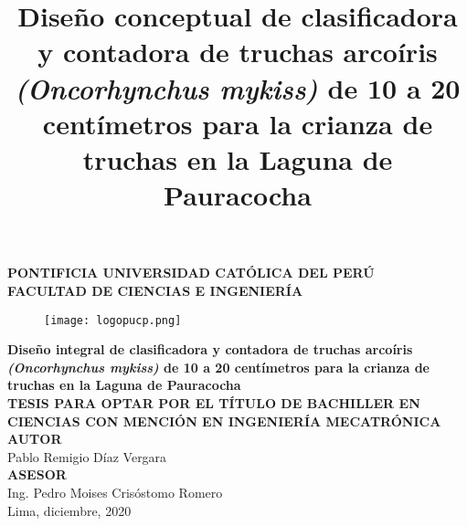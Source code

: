 \clearpage{\pagestyle{empty}\cleardoublepage}
\begin{titlepage}
	\begin{center}
		{\Large \bf PONTIFICIA UNIVERSIDAD CATÓLICA DEL PERÚ}\\
		\vspace{0.8 cm} 
		{\Large \bf FACULTAD DE CIENCIAS E INGENIERÍA}\\
		\vspace{1.75 cm}
		\begin{figure}[H]
			\centering
			\texttt{[image: logopucp.png]}
		\end{figure}
		\vspace{0.25cm}
		
		\title{Diseño conceptual de clasificadora y contadora de truchas arcoíris \textit{(Oncorhynchus mykiss)} de 10 a 20 centímetros para la crianza de truchas en la Laguna de Pauracocha} %
		{\Large \bf Diseño integral de clasificadora y contadora de truchas arcoíris \textit{(Oncorhynchus mykiss)} de 10 a 20 centímetros para la crianza de truchas en la Laguna de Pauracocha}\\ %
		\vspace{0.5cm}
		{\Large \bf TESIS PARA OPTAR POR EL TÍTULO DE BACHILLER EN CIENCIAS CON MENCIÓN EN INGENIERÍA MECATRÓNICA}\\[1.5 cm]
		{\large \bf AUTOR}\\[0.5cm]
		{\large Pablo Remigio Díaz Vergara}\\[1.5 cm] %
		{\large \bf ASESOR}\\[0.5 cm] 
		{\large Ing. Pedro Moises Crisóstomo Romero}\\[0.5 cm] %
		\vspace{2.0 cm}
		{\large Lima, diciembre, 2020}
		
	\end{center}
\end{titlepage}